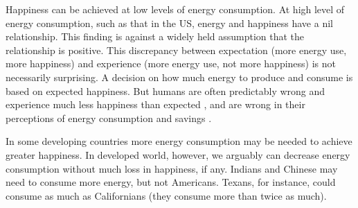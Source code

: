 \documentclass[10pt, letterpaper]{article}
\begin{document}
\begin{spacing}{1.0}
Happiness can be achieved at low levels of
energy consumption. At high level of energy consumption, such as
that in the  US, energy and happiness have a nil relationship. %
 This finding is against a widely held assumption that the relationship is
positive. This discrepancy between expectation (more energy use, more happiness)
and experience (more energy use, not more happiness) is not necessarily
 surprising. A decision on how much energy to produce and consume is based on
 expected happiness. But humans are often predictably wrong and experience much
 less happiness than expected \citep{kahneman97ws}, and are wrong
 in their perceptions of energy consumption and savings \citep{attari10,dietz14B}. 


In some developing countries more energy consumption may be needed to achieve greater happiness. In developed world, however, we
 arguably can decrease energy consumption without much loss in happiness, if any. %
Indians and Chinese may need to consume more energy, but not Americans. 
Texans, for instance,  could consume as much as Californians (they consume more than twice as
much). %


\end{spacing}
\end{document}
